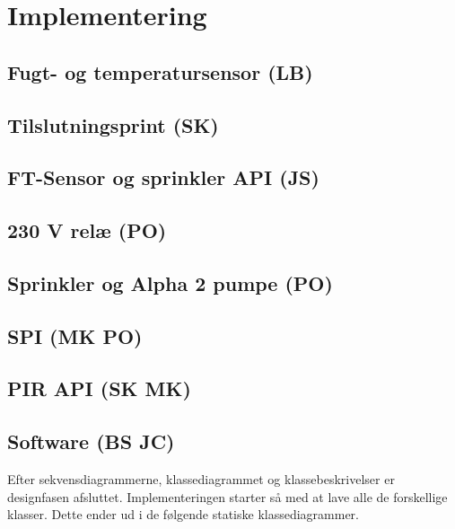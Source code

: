 \chapter{Implementering}

\section{Fugt- og temperatursensor (LB)}


\section{Tilslutningsprint (SK)}


\section{FT-Sensor og sprinkler API (JS)}


\section{230 V relæ (PO)}


\section{Sprinkler og Alpha 2 pumpe (PO)}


\newpage
\section{SPI (MK PO)}


\section{PIR API (SK MK)}


\section{Software (BS JC)}
Efter sekvensdiagrammerne, klassediagrammet og klassebeskrivelser er designfasen afsluttet. Implementeringen starter så med at lave alle de forskellige klasser. Dette ender ud i de følgende statiske klassediagrammer.


